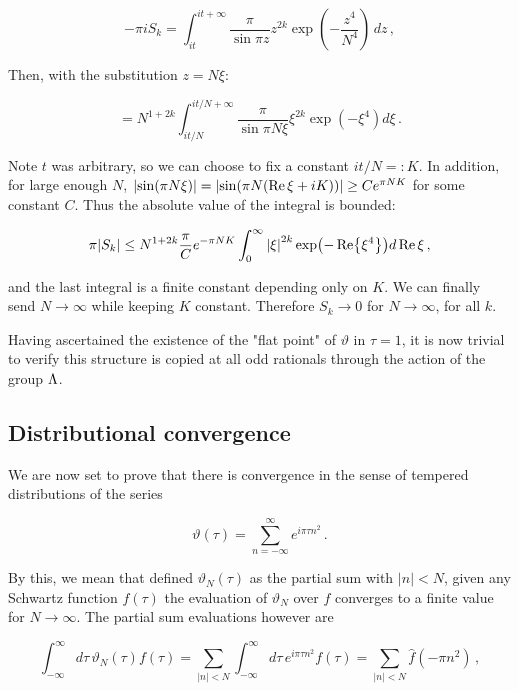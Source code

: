 \documentclass{article}
\newcommand{\intR}{\int_{-\infty}^\infty}
\newcommand{\sumZ}{\sum_{n=-\infty}^{\infty}}
\begin{document}
\begin{equation}
    - \pi i S_k = \int_{it}^{it + \infty} \frac{\pi}{\sin{\pi z}} z^{2k} \exp(-\frac{z^4}{N^4})\,dz\,,
\end{equation}

Then, with the substitution $z = N \xi$:

\begin{equation}
    = N^{1+2k} \int_{it/N}^{it/N + \infty} \frac{\pi}{\sin{\pi N \xi}} \xi^{2k} \exp(-\xi^4) d\xi\,.
\end{equation}

Note $t$ was arbitrary, so we can choose to fix a constant $it/N =: K$. In addition, for large enough $N$, $\abs{\sin(\pi N \xi)} = \abs{\sin(\pi N (\Re \xi + iK))} \geq C e^{\pi N K}$ for some constant $C$. Thus the absolute value of the integral is bounded:

\begin{equation}
    \pi \abs{S_k} \leq N^{1+2k} \frac{\pi}{C} e^{-\pi N K} \int_0^{\infty} \abs{\xi}^{2k} \exp(-\Re{\xi^{4}}) d\Re\xi\,,
\end{equation}

and the last integral is a finite constant depending only on $K$. We can finally send $N\rightarrow \infty$ while keeping $K$ constant. Therefore $S_k \rightarrow 0$ for $N\rightarrow \infty$, for all $k$.

Having ascertained the existence of the "flat point" of $\vartheta$ in $\tau = 1$, it is now trivial to verify this structure is copied at all odd rationals through the action of the group $\Lambda$.

\subsection{Distributional convergence}\label{sec:convergence}

We are now set to prove that there is convergence in the sense of tempered distributions of the series

\begin{equation}
    \vartheta(\tau) = \sumZ e^{i\pi \tau n^2}\,.
\end{equation}

By this, we mean that defined $\vartheta_N(\tau)$ as the partial sum with $|n| < N$, given any Schwartz function $f(\tau)$ the evaluation of $\vartheta_N$ over $f$ converges to a finite value for $N\rightarrow\infty$. The partial sum evaluations however are

\begin{equation}
    \intR d\tau \, \vartheta_N(\tau) f(\tau) = \sum_{|n|<N} \intR d\tau\, e^{i\pi\tau n^2} f(\tau) = \sum_{|n|<N} \hat f(-\pi n^2)\,,
\end{equation}
\end{document}
